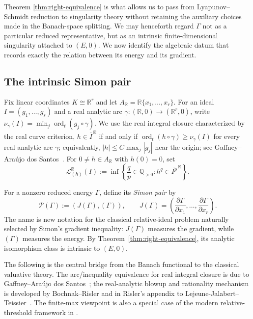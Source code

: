 \documentclass[11pt]{article}
\theoremstyle{definition}
\theoremstyle{remark}
\begin{document}
Theorem \ref{thm:right-equivalence} is what allows us to pass from Lyapunov--Schmidt reduction to singularity theory without retaining the auxiliary choices made in the Banach-space splitting. We may henceforth regard $\Gamma$ not as a particular reduced representative, but as an intrinsic finite-dimensional singularity attached to $(E,0)$. We now identify the algebraic datum that records exactly the relation between its energy and its gradient.


\subsection{The intrinsic Simon pair}


Fix linear coordinates $K\cong\mathbb R^r$ and let $A_{\mathbb R}=\mathbb R\{x_1,\ldots,x_r\}$. For an ideal $I=(g_1,\ldots,g_s)$ and a real analytic arc $\gamma:(\mathbb R,0)\to(\mathbb R^r,0)$, write $\nu_\gamma(I)=\min_j\operatorname{ord}_t(g_j\circ\gamma)$. We use the real integral closure characterized by the real curve criterion,
$h\in\overline I^{\,\mathbb R}$ if and only if $\operatorname{ord}_t(h\circ\gamma)\ge\nu_\gamma(I)$ for every real analytic arc $\gamma$; equivalently, $|h|\le C\max_j|g_j|$ near the origin; see Gaffney--Ara\'ujo dos Santos~\cite[Definition~2.1 and Proposition~2.2]{GaffneyAraujo2010}. For $0\ne h\in A_{\mathbb R}$ with $h(0)=0$, set
$$
\mathcal L^{\mathbb R}_{(h)}(I)
:=\inf\left\{\frac qp\in\mathbb Q_{>0}:h^q\in\overline{I^p}^{\,\mathbb R}\right\}.
$$

For a nonzero reduced energy $\Gamma$, define its \emph{Simon pair} by
$$
\mathcal P(\Gamma):=(J(\Gamma),(\Gamma)),
\qquad
J(\Gamma)=\left(\frac{\partial\Gamma}{\partial x_1},\ldots,
\frac{\partial\Gamma}{\partial x_r}\right).
$$
The name is new notation for the classical relative-ideal problem naturally selected by Simon's gradient inequality: $J(\Gamma)$ measures the gradient, while $(\Gamma)$ measures the energy. By Theorem~\ref{thm:right-equivalence}, its analytic isomorphism class is intrinsic to $(E,0)$.

The following is the central bridge from the Banach functional to the classical valuative theory. The arc/inequality equivalence for real integral closure is due to Gaffney--Ara\'ujo dos Santos~\cite{GaffneyAraujo2010}; the real-analytic blowup and rationality mechanism is developed by Bochnak--Risler and in Risler's appendix to Lejeune-Jalabert--Teissier~\cite{BochnakRisler1975,LejeuneTeissier2008}. The finite-max viewpoint is also a special case of the modern relative-threshold framework in \cite{Ha2026}.
\end{document}
